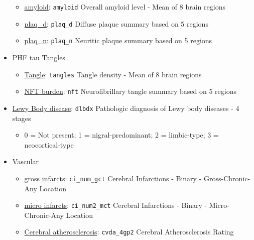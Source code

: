 \documentclass[]{book}
\providecommand{\tightlist}{%
  \setlength{\itemsep}{0pt}\setlength{\parskip}{0pt}}
\begin{document}
\begin{itemize}
  \begin{itemize}
  \tightlist
  \item
    \href{https://www.radc.rush.edu/docs/var/detail.htm?category=Pathology\&subcategory=Beta-Amyloid\&variable=amyloid}{amyloid}: \texttt{amyloid} Overall amyloid level - Mean of 8 brain regions
  \item
    \href{https://www.radc.rush.edu/docs/var/detail.htm?category=Pathology\&subcategory=Beta-Amyloid\&variable=plaq_d}{plaq\_d}: \texttt{plaq\_d} Diffuse plaque summary based on 5 regions
  \item
    \href{https://www.radc.rush.edu/docs/var/detail.htm?category=Pathology\&subcategory=Beta-Amyloid\&variable=plaq_n}{plaq\_n}: \texttt{plaq\_n} Neuritic plaque summary based on 5 regions
  \end{itemize}
\item
  PHF tau Tangles

  \begin{itemize}
  \tightlist
  \item
    \href{https://www.radc.rush.edu/docs/var/detail.htm?category=Pathology\&subcategory=PHF+tau+tangles\&variable=tangles}{Tangle}: \texttt{tangles} Tangle density - Mean of 8 brain regions
  \item
    \href{https://www.radc.rush.edu/docs/var/detail.htm?category=Pathology\&subcategory=PHF+tau+tangles\&variable=nft}{NFT burden}: \texttt{nft} Neurofibrillary tangle summary based on 5 regions
  \end{itemize}
\item
  \href{https://www.radc.rush.edu/docs/var/detail.htm?category=Pathology\&subcategory=Lewy+body\%2fPD\&variable=dlbdx}{Lewy Body disease}: \texttt{dlbdx} Pathologic diagnosis of Lewy body diseases - 4 stages

  \begin{itemize}
  \tightlist
  \item
    0 = Not present; 1 = nigral-predominant; 2 = limbic-type; 3 = neocortical-type
  \end{itemize}
\item
  Vascular

  \begin{itemize}
  \tightlist
  \item
    \href{https://www.radc.rush.edu/docs/var/detail.htm?category=Pathology\&subcategory=Vascular+-+Infarcts+(Presence+of)\&variable=ci_num2_gct}{gross infarcts}: \texttt{ci\_num\_gct} Cerebral Infarctions - Binary - Gross-Chronic-Any Location
  \item
    \href{https://www.radc.rush.edu/docs/var/detail.htm?category=Pathology\&subcategory=Vascular+-+Infarcts+(Presence+of)\&variable=ci_num2_mct}{micro infarcts}: \texttt{ci\_num2\_mct} Cerebral Infarctions - Binary - Micro-Chronic-Any Location
  \item
    \href{https://www.radc.rush.edu/docs/var/detail.htm?category=Pathology\&subcategory=Vascular+-+General+measures\&variable=cvda_4gp2}{Cerebral atherosclerosis}: \texttt{cvda\_4gp2} Cerebral Atherosclerosis Rating


\end{itemize}
\end{itemize}
\end{document}
